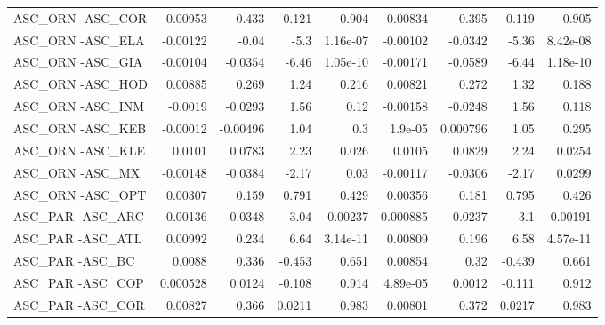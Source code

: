 \begin{tabular}{lrrrrrrrr}
ASC\_ORN -ASC\_COR                       &     0.00953 &        0.433 &  -0.121 &    0.904 &    0.00834 &       0.395 &       -0.119 &         0.905 \\
ASC\_ORN -ASC\_ELA                       &    -0.00122 &        -0.04 &    -5.3 & 1.16e-07 &   -0.00102 &     -0.0342 &        -5.36 &      8.42e-08 \\
ASC\_ORN -ASC\_GIA                       &    -0.00104 &      -0.0354 &   -6.46 & 1.05e-10 &   -0.00171 &     -0.0589 &        -6.44 &      1.18e-10 \\
ASC\_ORN -ASC\_HOD                       &     0.00885 &        0.269 &    1.24 &    0.216 &    0.00821 &       0.272 &         1.32 &         0.188 \\
ASC\_ORN -ASC\_INM                       &     -0.0019 &      -0.0293 &    1.56 &     0.12 &   -0.00158 &     -0.0248 &         1.56 &         0.118 \\
ASC\_ORN -ASC\_KEB                       &    -0.00012 &     -0.00496 &    1.04 &      0.3 &    1.9e-05 &    0.000796 &         1.05 &         0.295 \\
ASC\_ORN -ASC\_KLE                       &      0.0101 &       0.0783 &    2.23 &    0.026 &     0.0105 &      0.0829 &         2.24 &        0.0254 \\
ASC\_ORN -ASC\_MX                        &    -0.00148 &      -0.0384 &   -2.17 &     0.03 &   -0.00117 &     -0.0306 &        -2.17 &        0.0299 \\
ASC\_ORN -ASC\_OPT                       &     0.00307 &        0.159 &   0.791 &    0.429 &    0.00356 &       0.181 &        0.795 &         0.426 \\
ASC\_PAR -ASC\_ARC                       &     0.00136 &       0.0348 &   -3.04 &  0.00237 &   0.000885 &      0.0237 &         -3.1 &       0.00191 \\
ASC\_PAR -ASC\_ATL                       &     0.00992 &        0.234 &    6.64 & 3.14e-11 &    0.00809 &       0.196 &         6.58 &      4.57e-11 \\
ASC\_PAR -ASC\_BC                        &      0.0088 &        0.336 &  -0.453 &    0.651 &    0.00854 &        0.32 &       -0.439 &         0.661 \\
ASC\_PAR -ASC\_COP                       &    0.000528 &       0.0124 &  -0.108 &    0.914 &   4.89e-05 &      0.0012 &       -0.111 &         0.912 \\
ASC\_PAR -ASC\_COR                       &     0.00827 &        0.366 &  0.0211 &    0.983 &    0.00801 &       0.372 &       0.0217 &         0.983 \\

\end{tabular}
